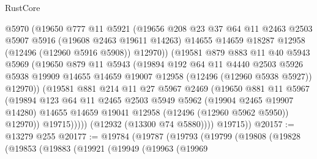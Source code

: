 \begin{lexlean}{RustCore}
\begin{coremodule}
                  @5970
                  (@19650
                    @777
                    @11
                    @5921
                    (@19656
                      @208
                      @23
                      @37
                      @64
                      @11
                      @2463
                      @2503
                      @5907
                      @5916
                      (@19608 @2463 @19611 @14263)
                      @14655
                      @14659
                      @18287
                      @12958
                      (@12496 (@12960 @5916 @5908))
                      @12970))
                  (@19581
                    @879
                    @883
                    @11
                    @40
                    @5943
                    @5969
                    (@19650
                      @879
                      @11
                      @5943
                      (@19894
                        @192
                        @64
                        @11
                        @4440
                        @2503
                        @5926
                        @5938
                        @19909
                        @14655
                        @14659
                        @19007
                        @12958
                        (@12496 (@12960 @5938 @5927))
                        @12970))
                    (@19581
                      @881
                      @214
                      @11
                      @27
                      @5967
                      @2469
                      (@19650
                        @881
                        @11
                        @5967
                        (@19894
                          @123
                          @64
                          @11
                          @2465
                          @2503
                          @5949
                          @5962
                          (@19904 @2465 @19907 @14280)
                          @14655
                          @14659
                          @19041
                          @12958
                          (@12496 (@12960 @5962 @5950))
                          @12970))
                      @19715)))))
            (@12932 (@13300 @74 @5880))))
        @19715))
@20157 := @13279 @255
@20177 := @19784
    (@19787
      (@19793
        (@19799
          (@19808
            (@19828
              (@19853
                (@19883
                  (@19921
                    (@19949
                      (@19963
                        (@19969

\end{coremodule}
\end{lexlean}
